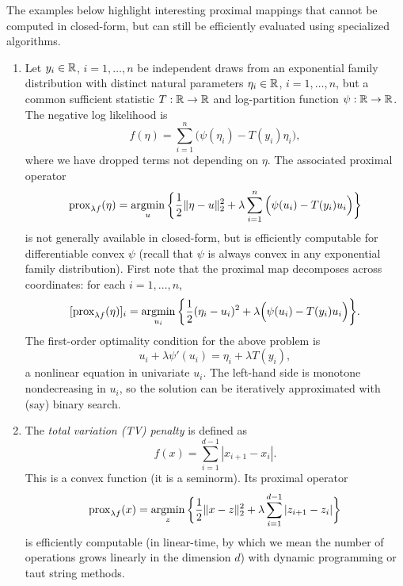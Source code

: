 \begin{Example}
\label{xa:proximal_mappings_efficient}
The examples below highlight interesting proximal mappings that cannot be 
computed in closed-form, but can still be efficiently evaluated using
specialized  algorithms.     

\begin{enumerate}[label=\alph*., ref=\alph*]
\item Let $y_i \in \mathbb{R}$, $i = 1,\dots,n$ be independent draws from an
  exponential family distribution with distinct natural parameters $\eta_i \in
  \mathbb{R}$, $i=1,\dots,n$, but a common sufficient statistic $T : \mathbb{R} \to \mathbb{R}$ and
  log-partition function $\psi : \mathbb{R} \to \mathbb{R}$. The negative log likelihood 
  is       
  \[
  f(\eta) = \sum_{i=1}^n \Big( \psi(\eta_i) - T(y_i) \eta_i \Big),
  \]
  where we have dropped terms not depending on $\eta$. The associated proximal
  operator 
  \[
  \operatorname{prox}_{\lambda f}(\eta) = \operatorname*{argmin}_{u} \bigg\{ \frac{1}{2} \|\eta - u\|_2^2 +
  \lambda \sum_{i=1}^n \Big( \psi(u_i) - T(y_i) u_i \Big) \bigg\}
  \]
  is not generally available in closed-form, but is efficiently computable for
  differentiable convex $\psi$ (recall that $\psi$ is always convex in any
  exponential family distribution). First note that the proximal map decomposes
  across coordinates: for each $i=1,\dots,n$,    
  \[
  [\operatorname{prox}_{\lambda f}(\eta)]_i = \operatorname*{argmin}_{u_i} \bigg\{ \frac{1}{2} (\eta_i -
  u_i)^2 + \lambda \Big( \psi(u_i) - T(y_i) u_i \Big) \bigg\}. 
  \]
  The first-order optimality condition for the above problem is 
  \[
  u_i + \lambda \psi'(u_i) = \eta_i + \lambda T(y_i),
  \]
  a nonlinear equation in univariate $u_i$. The left-hand side is monotone
  nondecreasing in $u_i$, so the solution can be iteratively approximated with
  (say) binary search.       

\item {}
  The \emph{total variation (TV) penalty} is defined as
  \begin{equation}
  \label{eq:tv}
  f(x) = \sum_{i=1}^{d-1} |x_{i+1} - x_i|.
  \end{equation}
  This is a convex function (it is a seminorm). Its proximal operator    
  \[
  \operatorname{prox}_{\lambda f}(x) = \operatorname*{argmin}_z \bigg\{ \frac{1}{2} \|x - z\|_2^2 + 
  \lambda \sum_{i=1}^{d-1} |z_{i+1} - z_i| \bigg\}
  \]
  is efficiently computable (in linear-time, by which we mean the number of
  operations grows linearly in the dimension $d$) with dynamic programming or  
  taut string methods.       


\end{enumerate}
\end{Example}
